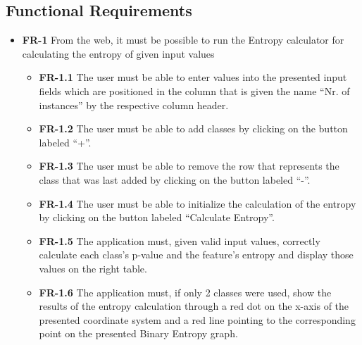 \subsection{Functional Requirements}
\begin{itemize}
    \item \textbf{FR-1} From the web, it must be possible to run the Entropy calculator for calculating the entropy of given input values
    \begin{itemize}
        \item \textbf{FR-1.1} The user must be able to enter values into the presented input fields which are positioned in the column that is given the name ``Nr. of instances'' by the respective column header.
        \item \textbf{FR-1.2} The user must be able to add classes by clicking on the button labeled ``+''.
        \item \textbf{FR-1.3} The user must be able to remove the row that represents the class that was last added by clicking on the button labeled ``-''.
        \item \textbf{FR-1.4} The user must be able to initialize the calculation of the entropy by clicking on the button labeled ``Calculate Entropy''.
        \item \textbf{FR-1.5} The application must, given valid input values, correctly calculate each class's p-value and the feature's entropy and display those values on the right table.
        \item \textbf{FR-1.6} The application must, if only 2 classes were used, show the results of the entropy calculation through a red dot on the x-axis of the presented coordinate system and a red line pointing to the corresponding point on the presented Binary Entropy graph.
    \end{itemize}
\end{itemize}

